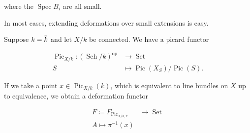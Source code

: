 \begin{center}
  \end{center}

where the \(\operatorname{Spec}B_i\) are all small.

\begin{description}
\tightlist
\item[Remark]
In most cases, extending deformations over small extensions is easy.
\item[Example]
Suppose
\(k=\mkern 1.5mu\overline{\mkern-1.5muk\mkern-1.5mu}\mkern 1.5mu\) and
let \(X/k\) be connected. We have a picard functor
\end{description}

\begin{align*}   {\operatorname{Pic}}_{X/k}: ({\operatorname{Sch}}/k)^\operatorname{op}&\to {\operatorname{Set}}\\   S &\mapsto {\operatorname{Pic}}(X_S) / {\operatorname{Pic}}(S)   .\end{align*}

If we take a point \(x\in {\operatorname{Pic}}_{X/k}(k)\), which is
equivalent to line bundles on \(X\) up to equivalence, we obtain a
deformation functor

\begin{align*}   F \coloneqq F_{{\operatorname{Pic}}_{ X/k, x  }} &\to {\operatorname{Set}}\\   A \mapsto \pi^{-1}(x)   \end{align*}

